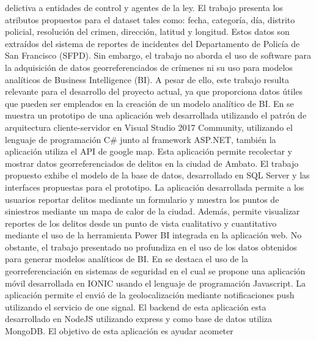 delictiva a entidades de control y agentes de la ley. El trabajo presenta los atributos propuestos para el dataset tales como:
fecha, categoría, día, distrito policial, resolución del crimen, dirección, latitud y longitud. Estos datos son extraídos del
sistema de reportes de incidentes del Departamento de Policía de San Francisco (SFPD). Sin embargo, el trabajo no aborda el uso
de software para la adquisición de datos georreferenciados de crímenes ni su uso para modelos analíticos de Business Intelligence
(BI). A pesar de ello, este trabajo resulta relevante para el desarrollo del proyecto actual, ya que proporciona datos útiles que
pueden ser empleados en la creación de un modelo analítico de BI.
\bigbreak
En \cite{botto-tobarAppliedTechnologiesSecond2021} se muestra un prototipo de una aplicación web desarrollada
utilizando el patrón de arquitectura cliente-servidor en Visual Studio 2017 Community, utilizando el lenguaje de programación C\#
junto al framework ASP.NET, también la aplicación utiliza el API de google map. Esta aplicación permite recolectar y mostrar datos
georreferenciados de delitos en la ciudad de Ambato. El trabajo propuesto exhibe el modelo de la base de datos, desarrollado en SQL
Server  y las interfaces propuestas para el prototipo. La aplicación desarrollada permite a los usuarios reportar delitos mediante
un formulario y muestra los puntos de siniestros mediante un mapa de calor de la ciudad. Además, permite visualizar reportes de los
delitos desde un punto de vista cualitativo y cuantitativo mediante el uso de la herramienta Power BI integrada en la aplicación web.
No obstante, el trabajo presentado no profundiza en el uso de los datos obtenidos para generar modelos analíticos de BI.
\bigbreak
En \cite{chasichangoAplicacionMovilApoyo2022} se destaca el uso de la georreferenciación en sistemas de seguridad en el cual
se propone una aplicación móvil desarrollada en IONIC usando el lenguaje de programación Javascript. La aplicación permite el
envió de la geolocalización mediante notificaciones push utilizando el servicio de one signal. El backend de esta aplicación esta
desarrollado en NodeJS utilizando express y como base de datos utiliza MongoDB. El objetivo de esta aplicación es ayudar acometer
